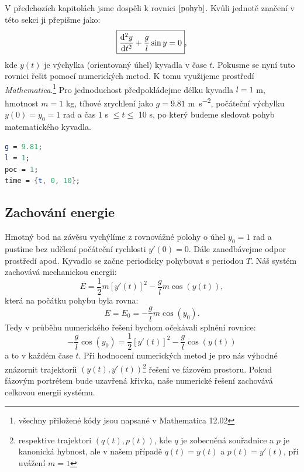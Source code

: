 V předchozích kapitolách jsme dospěli k rovnici $\eqref{pohyb}$. Kvůli jednotě značení v této sekci ji přepišme jako:
\begin{equation}
\label{rovnice}
\boxed{\frac{\mathrm{d}^{2} y}{\mathrm{d} t ^{2}} + \frac{g}{l}\sin y=0},
\end{equation}
kde $y(t)$ je výchylka (orientovaný úhel) kyvadla v čase $t$.
Pokusme se nyní tuto rovnici řešit pomocí numerických metod. K tomu využijeme prostředí \textit{Mathematica}.\footnote{všechny přiložené kódy jsou napsané v Mathematica 12.02}
Pro jednoduchost předpokládejme délku kyvadla $l=1$ \si{m}, hmotnost $m = 1$ \si{kg}, tíhové zrychlení jako $g = 9.81$ \si{m.s^{-2}}, počáteční výchylku $y(0)=y_{0}=1$ \si{rad} a čas $1$ \si{s} $\leq t \leq$ 10 \si{s}, po který budeme sledovat pohyb matematického kyvadla.
\begin{lstlisting}[language=Mathematica, caption=Konstanty]
g = 9.81;
l = 1;
poc = 1;
time = {t, 0, 10};
\end{lstlisting}

\subsection{Zachování energie}
\label{sec:Zachování energie}
Hmotný bod na závěsu vychýlíme z rovnovážné polohy o úhel $y_{0}=1$ \si{rad} a pustíme bez udělení počáteční rychlosti $y'(0)=0$. Dále zanedbávejme odpor prostředí apod. Kyvadlo se začne periodicky pohybovat s periodou $T$. Náš systém zachovává mechanickou energii:
\begin{equation}
E = \frac{1}{2} m [y'(t)]^{2}- \frac{g}{l} m \cos(y(t)),
\end{equation} 
která na počátku pohybu byla rovna:
\begin{equation}
E = E_{0} = - \frac{g}{l} m \cos(y_{0}).
\end{equation} 
Tedy v průběhu numerického řešení bychom očekávali splnění rovnice:
\begin{equation}
\label{ener}
\boxed{- \frac{g}{l}  \cos(y_{0}) = \frac{1}{2} [y'(t)]^{2} - \frac{g}{l} \cos(y(t))}
\end{equation} 
a to v každém čase $t$. Při hodnocení numerických metod je pro nás výhodné znázornit trajektorii $(y(t),y'(t))$\footnote{respektive trajektori $(q(t),p(t))$, kde $q$ je zobecněná souřadnice a $p$ je kanonická hybnost, ale v našem případě $q(t)=y(t)$ a $p(t)=y'(t)$, při uvážení $m=1$} řešení ve fázovém prostoru. Pokud fázovým portrétem bude uzavřená křivka, naše numerické řešení zachovává celkovou energii systému.

